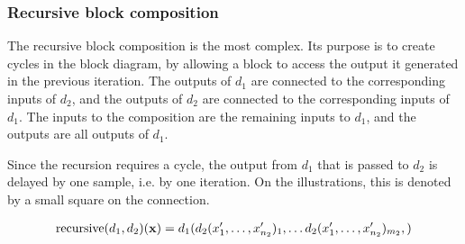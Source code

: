 \subsubsection{Recursive block composition}
The recursive block composition is the most complex. Its purpose is to create cycles in the block diagram, by
allowing a block to access the output it generated in the previous iteration. The outputs of
$d_1$ are connected to the corresponding inputs of $d_2$, and the outputs
of $d_2$ are connected to the corresponding inputs of $d_1$. The inputs to
the composition are the remaining inputs to $d_1$, and the outputs are all outputs of
$d_1$.

Since the recursion requires a cycle, the output from $d_1$ that is passed to
$d_2$ is delayed by one sample, i.e. by one iteration. On the illustrations, this is denoted
by a small square on the connection.

\begin{minipage}{0.5\linewidth}
  \begin{prooftree}
  \end{prooftree}
  \begin{align*}
    \Recursive(d_1, d_2)(\mathbf{x}) ={} & d_1(d_2(x'_1, \dots, x'_{n_2})_1, \dots d_2(x'_1, \dots, x'_{n_2})_{m_2}, ) \\
  \end{align*}
\end{minipage}
\begin{minipage}{0.5\linewidth}
  \begin{figure}[H]
    \centering
    \label{fig:block_rec}
    
  \end{figure}
\end{minipage}

